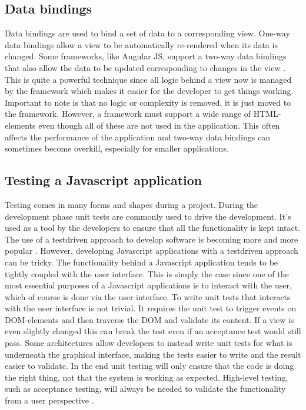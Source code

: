 \subsection{Data bindings}

Data bindings are used to bind a set of data to a corresponding view. One-way data bindings allow a view to be automatically re-rendered when its data is changed. Some frameworks, like Angular JS, support a two-way data bindings that also allow the data to be updated corresponding to changes in the view \cite{angularjs_twoway_databinding}. This is quite a powerful technique since all logic behind a view now is managed by the framework which makes it easier for the developer to get things working. Important to note is that no logic or complexity is removed, it is just moved to the framework. However, a framework must support a wide range of HTML-elements even though all of these are not used in the application. This often affects the performance of the application and two-way data bindings can sometimes become overkill, especially for smaller applications.

\subsection{Testing a Javascript application}

\label{sec:background_testing}

Testing comes in many forms and shapes during a project. During the development phase unit tests are commonly used to drive the development. It's used as a tool by the developers to ensure that all the functionality is kept intact. The use of a testdriven approach to develop software is becoming more and more popular \cite{tdd_popular}. However, developing Javascript applications with a testdriven approach can be tricky. The functionality behind a Javascript application tends to be tightly coupled with the user interface. This is simply the case since one of the most essential purposes of a Javascript applications is to interact with the user, which of course is done via the user interface. To write unit tests that interacts with the user interface is not trivial. It requires the unit test to trigger events on DOM-elements and then traverse the DOM and validate its content. If a view is even slightly changed this can break the test even if an acceptance test would still pass. Some architectures allow developers to instead write unit tests for what is underneath the graphical interface, making the tests easier to write and the result easier to validate. In the end unit testing will only ensure that the code is doing the right thing, not that the system is working as expected. High-level testing, such as acceptance testing, will always be needed to validate the functionality from a user perspective \cite{acceptance_testing}.

